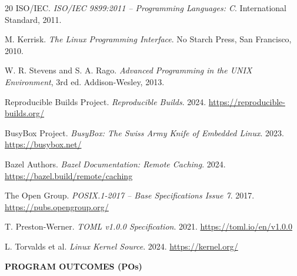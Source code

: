 \documentclass[12pt,a4paper]{report}
\begin{document}
\begin{thebibliography}{20}
ISO/IEC.
\textit{ISO/IEC 9899:2011 -- Programming Languages: C}.
International Standard, 2011.

M. Kerrisk.
\textit{The Linux Programming Interface}.
No Starch Press, San Francisco, 2010.

W. R. Stevens and S. A. Rago.
\textit{Advanced Programming in the UNIX Environment}, 3rd ed.
Addison-Wesley, 2013.

Reproducible Builds Project.
\textit{Reproducible Builds}.
2024. \url{https://reproducible-builds.org/}

BusyBox Project.
\textit{BusyBox: The Swiss Army Knife of Embedded Linux}.
2023. \url{https://busybox.net/}

Bazel Authors.
\textit{Bazel Documentation: Remote Caching}.
2024. \url{https://bazel.build/remote/caching}

The Open Group.
\textit{POSIX.1-2017 -- Base Specifications Issue 7}.
2017. \url{https://pubs.opengroup.org/}

T. Preston-Werner.
\textit{TOML v1.0.0 Specification}.
2021. \url{https://toml.io/en/v1.0.0}

L. Torvalds et al.
\textit{Linux Kernel Source}.
2024. \url{https://kernel.org/}

\end{thebibliography}

\clearpage
{}
{}
\enlargethispage{6\baselineskip}

\begin{center}
  {\large\bfseries PROGRAM OUTCOMES (POs)}
\end{center}
\vspace{4pt}
\end{document}
